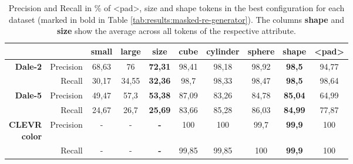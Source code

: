\begin{table}[ht]
    \centering
    \begin{tabular}{rr|cc|c|ccc|c|c}
        \toprule
                                         &             & {small} & {large} & \textbf{size}  & {cube}  & {cylinder} & {sphere} & \textbf{shape} & {<pad>} \\\midrule
        \multirow{2}{*}{\textbf{Dale-2}} & {Precision} & {68,63} & {76}    & \textbf{72,31} & {98,41} & {98,18}    & {98,92}  & \textbf{98,5}  & {94,77} \\
                                         & {Recall}    & {30,17} & {34,55} & \textbf{32,36} & {98,7}  & {98,33}    & {98,47}  & \textbf{98,5}  & {98,64} \\\midrule
        \multirow{2}{*}{\textbf{Dale-5}} & {Precision} & {49,47} & {57,3}  & \textbf{53,38} & {87,09} & {83,26}    & {84,78}  & \textbf{85,04} & {64,99} \\
                                         & {Recall}    & {24,67} & {26,7}  & \textbf{25,69} & {83,66} & {85,28}    & {86,03}  & \textbf{84,99} & {77,87} \\\midrule
        \multirowcell{2}[0pt][r]{\textbf{CLEVR}                                                                                                          \\\textbf{color}} & {Precision}  & {-}     & {-}     & \textbf{-}     & {100} & {100} & {99,7} & \textbf{99,9} & {100}   \\
                                         & {Recall}    & {-}     & {-}     & \textbf{-}     & {99,85} & {99,85}    & {100}    & \textbf{99,9}  & {100}   \\
        \bottomrule
    \end{tabular}
    \caption{Precision and Recall in \% of <pad>, size and shape tokens in the best configuration for each dataset (marked in bold in Table \ref{tab:results:masked-re-generator}). The columns \textbf{shape} and \textbf{size} show the average across all tokens of the respective attribute.}
    \label{tab:results:masked-re-generator_size-shape}
\end{table}

